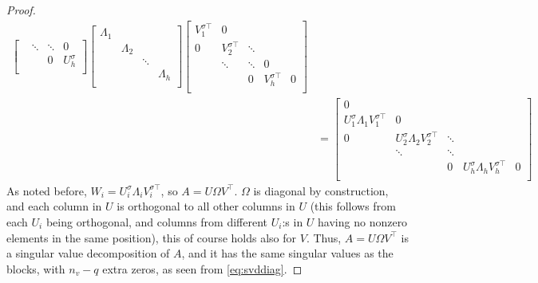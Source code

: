 \documentclass[10pt,a4paper]{amsart}
\begin{document}
\begin{proof}
\begin{align}
\begin{bmatrix}
		& \ddots & \ddots & 0\\
		& & 0 & U_h^\sigma \\
	\end{bmatrix}
	\begin{bmatrix}
		\Lambda_1 & & & \\
		& \Lambda_2 & & \\
		& & \ddots & \\
		& & & \Lambda_h \\
	\end{bmatrix}
	\begin{bmatrix}
		V_1^{\sigma \top} & 0 & & &  \\
		0 & V_2^{\sigma \top} & \ddots & & \\
		& \ddots & \ddots & 0 & \\
		& & 0 & V_h^{\sigma \top} & 0 \\
	\end{bmatrix} \nonumber \\
	& =\begin{bmatrix}
		0 & & & & \\
		U_1^\sigma \Lambda_1 V_1^{\sigma \top} & 0 & & & \\
		0 & U_2^\sigma \Lambda_2 V_2^{\sigma \top} & \ddots & & \\
		& \ddots & \ddots & & \\
		& & 0 & U_h^\sigma \Lambda_h V_h^{\sigma \top} & 0 \\
	\end{bmatrix}
\end{align}
As noted before, $W_i=U_i^\sigma \Lambda_iV_i^{\sigma \top}$, so $A=U\Omega V^\top $. $\Omega$ is diagonal by construction, and each column in $U$ is orthogonal to all other columns in $U$ (this follows from each $U_i$ being orthogonal, and columns from different $U_i$:s in $U$ having no nonzero elements in the same position), this of course holds also for $V$. Thus, $A=U\Omega V^\top $ is a singular value decomposition of $A$, and it has the same singular values as the blocks, with $n_v-q$ extra zeros, as seen from \eqref{eq:svddiag}.
\end{proof}
\end{document}
